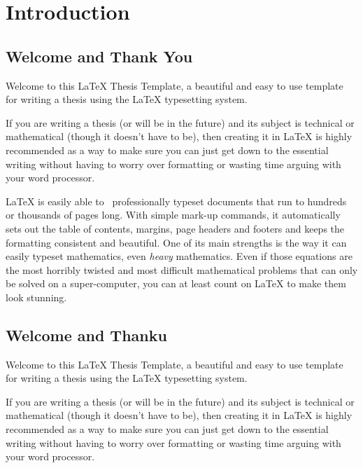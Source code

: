\chapter{Introduction}\label{ch:chapter1} %



\section{Welcome and Thank You}\label{sec:welcome}
Welcome to this \LaTeX{} Thesis Template, a beautiful and easy to use template for writing a thesis using the \LaTeX{} typesetting system.

If you are writing a thesis (or will be in the future) and its subject is technical or mathematical (though it doesn't have to be), then creating it in \LaTeX{} is highly recommended as a way to make sure you can just get down to the essential writing without having to worry over formatting or wasting time arguing with your word processor.

\LaTeX{} is easily able to~\parencite{RN93} professionally typeset documents that run to hundreds or thousands of pages long. With simple mark-up commands, it automatically sets out the table of contents, margins, page headers and footers and keeps the formatting consistent and beautiful. One of its main strengths is the way it can easily typeset mathematics, even \emph{heavy} mathematics. Even if those equations are the most horribly twisted and most difficult mathematical problems that can only be solved on a super-computer, you can at least count on \LaTeX{} to make them look stunning.


\section{Welcome and Thanku}\label{sec:welome}
Welcome to this \LaTeX{} Thesis Template, a beautiful and easy to use template for writing a thesis using the \LaTeX{} typesetting system.

If you are writing a thesis (or will be in the future) and its subject is technical or mathematical (though it doesn't have to be), then creating it in \LaTeX{} is highly recommended as a way to make sure you can just get down to the essential writing without having to worry over formatting or wasting time arguing with your word processor.

